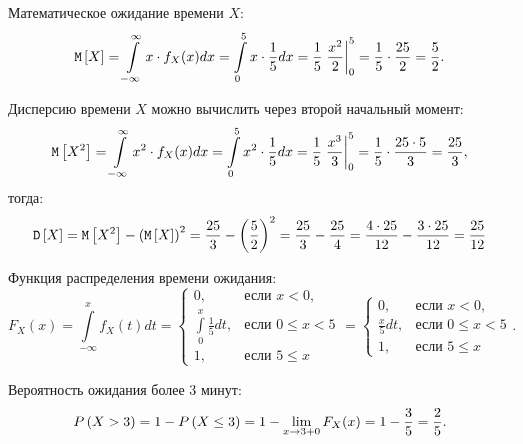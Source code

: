 Математическое ожидание времени $X$:
\begin{equation}
    \mathtt{M} \left [ X \right ]
    = \int \limits_{-\infty}^{\infty} x \cdot f_X(x) dx
    = \int \limits_0^5 x \cdot \frac{1}{5} dx
    = \frac{1}{5} \left . \frac{x^2}{2} \right |_0^5
    = \frac{1}{5} \cdot \frac{25}{2}
    = \frac{5}{2} .
\end{equation}

Дисперсию времени $X$ можно вычислить через второй начальный момент:
\begin{equation}
    \mathtt{M} \left [ X^2 \right ]
    = \int \limits_{-\infty}^{\infty} x^2 \cdot f_X(x) dx
    = \int \limits_0^5 x^2 \cdot \frac{1}{5} dx
    = \frac{1}{5} \left . \frac{x^3}{3} \right |_0^5
    = \frac{1}{5} \cdot \frac{25 \cdot 5}{3}
    = \frac{25}{3} ,
\end{equation}
тогда:
\begin{equation}
    \mathtt{D} \left [ X \right ]
    = \mathtt{M} \left [ X^2 \right ] - \left ( \mathtt{M} \left [ X \right ] \right )^2
    = \frac{25}{3} - \left ( \frac{5}{2} \right )^2
    = \frac{25}{3} - \frac{25}{4}
    = \frac{4 \cdot 25}{12} - \frac{3 \cdot 25}{12}
    = \frac{25}{12}
\end{equation}

Функция распределения времени ожидания:
\begin{equation}
    F_X(x)
    = \int \limits_{-\infty}^x f_X(t) dt
    = \left \{
    \begin{array}{ll}
        0,                                 & \text{если } x < 0,      \\
        \int \limits_{0}^x \frac{1}{5} dt, & \text{если } 0 \le x < 5 \\
        1,                                 & \text{если } 5 \le x
    \end{array}
    \right .
    = \left \{
    \begin{array}{ll}
        0,              & \text{если } x < 0,      \\
        \frac{x}{5} dt, & \text{если } 0 \le x < 5 \\
        1,              & \text{если } 5 \le x
    \end{array}
    \right .
    .
\end{equation}

Вероятность ожидания более 3 минут:
\begin{equation}
    P \left ( X > 3 \right )
    = 1 - P \left ( X \le 3 \right )
    = 1 - \lim \limits_{x \rightarrow 3 + 0} F_X(x)
    = 1 - \frac{3}{5}
    = \frac{2}{5}.
\end{equation}

